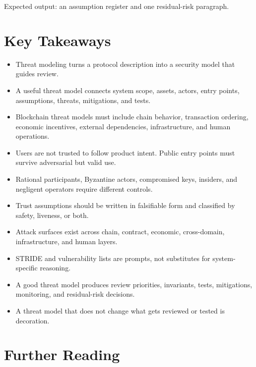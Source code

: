 Expected output: an assumption register and one residual-risk paragraph.

\section{Key Takeaways}

\begin{itemize}
\tightlist
\item
  Threat modeling turns a protocol description into a security model
  that guides review.
\item
  A useful threat model connects system scope, assets, actors, entry
  points, assumptions, threats, mitigations, and tests.
\item
  Blockchain threat models must include chain behavior, transaction
  ordering, economic incentives, external dependencies, infrastructure,
  and human operations.
\item
  Users are not trusted to follow product intent. Public entry points
  must survive adversarial but valid use.
\item
  Rational participants, Byzantine actors, compromised keys, insiders,
  and negligent operators require different controls.
\item
  Trust assumptions should be written in falsifiable form and classified
  by safety, liveness, or both.
\item
  Attack surfaces exist across chain, contract, economic, cross-domain,
  infrastructure, and human layers.
\item
  STRIDE and vulnerability lists are prompts, not substitutes for
  system-specific reasoning.
\item
  A good threat model produces review priorities, invariants, tests,
  mitigations, monitoring, and residual-risk decisions.
\item
  A threat model that does not change what gets reviewed or tested is
  decoration.
\end{itemize}

\section{Further Reading}


